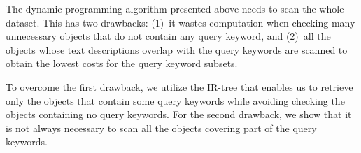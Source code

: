 \documentclass{sig-alternate}
\newcommand{\Dist}{\mbox{$\mathsf{Dist}$}\xspace}
\newcounter{example}[section]
\renewcommand{\theexample}{\nthesection.\arabic{example}}
\newenvironment{example}{
    \refstepcounter{example}
    {\vspace{1ex} \noindent\bf  Example  \theexample:}}{
    \eop\vspace{1ex}} %
\newcounter{theorem}[section]
\renewcommand{\thetheorem}{\nthesection.\arabic{theorem}}
\newenvironment{lemma}{\begin{em}
    \refstepcounter{theorem}
    {\vspace{1ex} \noindent\bf  Lemma  \thetheorem:}}{
    \end{em}\eop\vspace{1ex}} %
\newcommand{\nthesection}{\arabic{section}}
\newcommand{\eop}{\hspace*{\fill}\mbox{$\Box$}}
\begin{document}
The dynamic programming algorithm presented above needs to scan the
whole dataset. This has two drawbacks: (1)~it wastes computation
when checking many unnecessary objects that do not contain any query
keyword, and (2)~all the objects whose text descriptions overlap
with the query keywords are scanned to obtain the lowest costs for
the query keyword subsets.

To overcome the first drawback, we utilize the
IR-tree that enables us to retrieve only the objects that contain some
query keywords while avoiding checking the objects containing no query
keywords.
%
For the second drawback, we show that it is not always necessary to
scan all the objects covering part of the query keywords.
%
%
%
%
%
%
\end{document}
